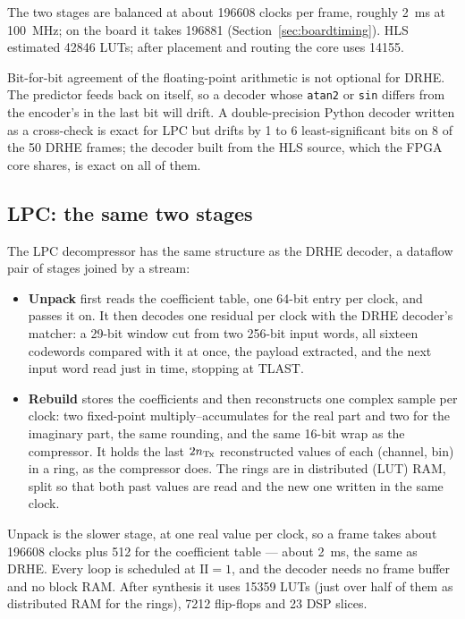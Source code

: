 \noindent
The two stages are balanced at about \num{196608} clocks per frame, roughly
\SI{2}{\milli\second} at \SI{100}{\mega\hertz}; on the board it takes
\num{196881} (Section~\ref{sec:boardtiming}). HLS estimated \num{42846} LUTs; after
placement and routing the core uses \num{14155}.

Bit-for-bit agreement of the floating-point arithmetic is not optional for
DRHE. The predictor feeds back on itself, so a decoder whose \texttt{atan2} or
\texttt{sin} differs from the encoder's in the last bit will drift. A
double-precision Python decoder written as a cross-check is exact for LPC but
drifts by 1 to 6 least-significant bits on 8 of the 50 DRHE frames; the
decoder built from the HLS source, which the FPGA core shares, is exact on all
of them.

\subsection{LPC: the same two stages}

The LPC decompressor has the same structure as the DRHE decoder, a dataflow
pair of stages joined by a stream:

\begin{itemize}
\item \textbf{Unpack} first reads the coefficient table, one 64-bit entry per
clock, and passes it on. It then decodes one residual per clock with the DRHE
decoder's matcher: a 29-bit window cut from two 256-bit input words, all sixteen
codewords compared with it at once, the payload extracted, and the next input
word read just in time, stopping at TLAST.
\item \textbf{Rebuild} stores the coefficients and then reconstructs one complex
sample per clock: two fixed-point multiply--accumulates for the real part and
two for the imaginary part, the same rounding, and the same 16-bit wrap as the
compressor. It holds the last $2n_{\mathrm{Tx}}$ reconstructed values of each (channel,
bin) in a ring, as the compressor does. The rings are in distributed (LUT) RAM,
split so that both past values are read and the new one written in the same
clock.
\end{itemize}

\noindent
Unpack is the slower stage, at one real value per clock, so a frame takes about
\num{196608} clocks plus 512 for the coefficient table --- about
\SI{2}{\milli\second}, the same as DRHE. Every loop is scheduled at
$\mathrm{II} = 1$, and the decoder needs no frame buffer and no block RAM.
After synthesis it uses \num{15359} LUTs (just over half of them as distributed
RAM for the rings), \num{7212} flip-flops and 23 DSP slices.

